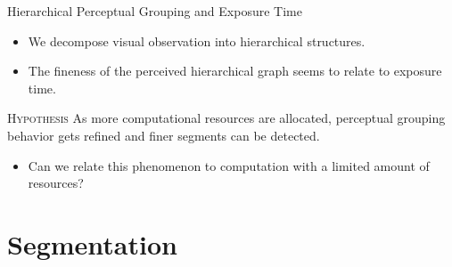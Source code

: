 \documentclass[10pt,xcolor=svgnames]{beamer} %
\begin{document}
\begin{frame}{Hierarchical Perceptual Grouping and Exposure Time}
\begin{itemize}
    \item We decompose visual observation into hierarchical structures.
    \pause
    \item The fineness of the perceived hierarchical graph seems to relate to exposure time. 
    \pause
\end{itemize}
    
\begin{exampleblock}{\textsc{Hypothesis}}
As more computational resources are allocated, perceptual grouping behavior gets refined and finer segments can be detected.
\end{exampleblock}

\begin{itemize}
    \item Can we relate this phenomenon to computation with a limited amount of resources?
\end{itemize}
\end{frame}


\section{Segmentation}
\end{document}
